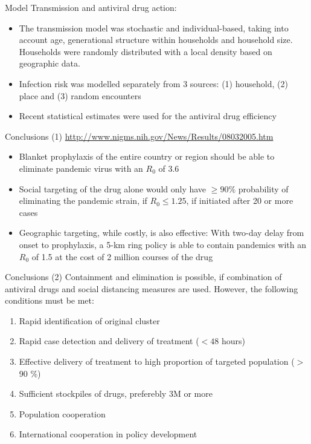 \documentclass{beamer}
\begin{document}
\begin{frame}{Model}
Transmission and antiviral drug action:
\begin{itemize}
\item The transmission model was stochastic and individual-based, taking into account age, generational structure within households and household size. Households were randomly distributed with a local density based on geographic data.
\item Infection risk was modelled separately from 3 sources: (1) household, (2) place and (3) random encounters
\item Recent statistical estimates were used for the antiviral drug efficiency
\end{itemize}
\end{frame}


\begin{frame}{Conclusions (1)}
\href{http://www.nigms.nih.gov/News/Results/08032005.htm}{http://www.nigms.nih.gov/News/Results/08032005.htm}
\begin{itemize}
\item Blanket prophylaxis of the entire country or region should be able to eliminate pandemic virus with an $R_0$ of 3.6
\item Social targeting of the drug alone would only have $\geq 90 \%$ probability of eliminating the pandemic strain, if $R_0 \leq 1.25$, if initiated after 20 or more cases
\item Geographic targeting, while costly, is also effective: With two-day delay from onset to prophylaxis, a 5-km ring policy is able to contain pandemics with an $R_0$ of 1.5 at the cost of 2 million courses of the drug
\end{itemize}
\end{frame}

\begin{frame}{Conclusions (2)}
Containment and elimination is possible, if combination of antiviral drugs and social distancing measures are used. However, the following conditions must be met:

\begin{enumerate}
\item Rapid identification of original cluster
\item Rapid case detection and delivery of treatment ($<48$ hours)
\item Effective delivery of treatment to high proportion of targeted population ($>$ 90 \%)
\item Sufficient stockpiles of drugs, preferebly 3M or more
\item Population cooperation
\item International cooperation in policy development
\end{enumerate}
\end{frame}
\end{document}
